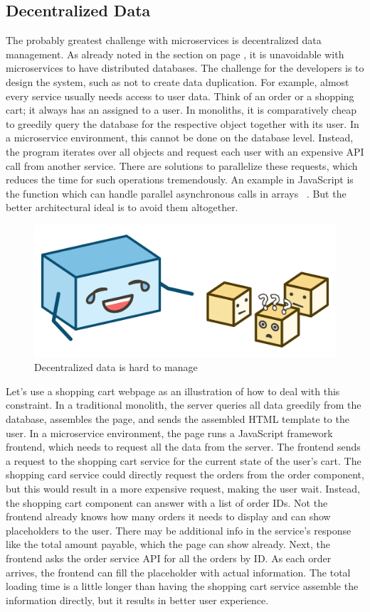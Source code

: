 \subsection{Decentralized Data}

The probably greatest challenge with microservices is decentralized data management. As already noted in the section on page \pageref{sec:theory:decentralized-data}, it is unavoidable with microservices to have distributed databases. The challenge for the developers is to design the system, such as not to create data duplication. For example, almost every service usually needs access to user data. Think of an order or a shopping cart; it always has an assigned to a user. In monoliths, it is comparatively cheap to greedily query the database for the respective object together with its user. In a microservice environment, this cannot be done on the database level. Instead, the program iterates over all objects and request each user with an expensive API call from another service. There are solutions to parallelize these requests, which reduces the time for such operations tremendously. An example in JavaScript is the  function which can handle parallel asynchronous calls in arrays ~\cite{mdn.2020}. But the better architectural ideal is to avoid them altogether.

\begin{figure}[ht]
  \centering
  \includegraphics[width=0.55\linewidth]{assets/illustration-decentralized-data.png}
  \caption{Decentralized data is hard to manage}
\end{figure}

Let's use a shopping cart webpage as an illustration of how to deal with this constraint. In a traditional monolith, the server queries all data greedily from the database, assembles the page, and sends the assembled HTML template to the user. In a microservice environment, the page runs a JavaScript framework frontend, which needs to request all the data from the server. The frontend sends a request to the shopping cart service for the current state of the user's cart. The shopping card service could directly request the orders from the order component, but this would result in a more expensive request, making the user wait. Instead, the shopping cart component can answer with a list of order IDs. Not the frontend already knows how many orders it needs to display and can show placeholders to the user. There may be additional info in the service's response like the total amount payable, which the page can show already. Next, the frontend asks the order service API for all the orders by ID. As each order arrives, the frontend can fill the placeholder with actual information. The total loading time is a little longer than having the shopping cart service assemble the information directly, but it results in better user experience.

